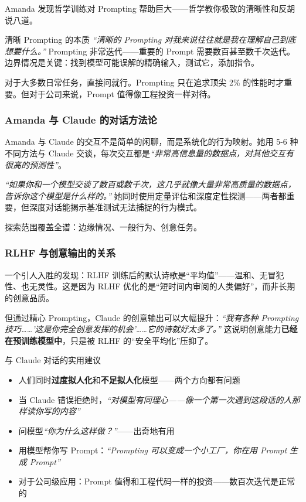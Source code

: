 \documentclass[a4paper]{article}
\begin{document}
Amanda 发现哲学训练对 Prompting 帮助巨大——哲学教你极致的清晰性和反胡说八道。

\begin{importantbox}{清晰 Prompting 的本质}
\textit{``清晰的 Prompting 对我来说往往就是我在理解自己到底想要什么。''} Prompting 非常迭代——重要的 Prompt 需要数百甚至数千次迭代。边界情况是关键：找到模型可能误解的精确输入，测试它，添加指令。

对于大多数日常任务，直接问就行。Prompting 只在追求顶尖 2\% 的性能时才重要。但对于公司来说，Prompt 值得像工程投资一样对待。
\end{importantbox}

\subsubsection{Amanda 与 Claude 的对话方法论}

Amanda 与 Claude 的交互不是简单的闲聊，而是系统化的行为映射。她用 5-6 种不同方法与 Claude 交谈，每次交互都是\textit{``非常高信息量的数据点，对其他交互有很高的预测性''}。

\textit{``如果你和一个模型交谈了数百或数千次，这几乎就像大量非常高质量的数据点，告诉你这个模型是什么样的。''} 她同时使用定量评估和深度定性探测——两者都重要，但深度对话能揭示基准测试无法捕捉的行为模式。

探索范围覆盖全谱：边缘情况、一般行为、创意任务。

\subsubsection{RLHF 与创意输出的关系}

一个引人入胜的发现：RLHF 训练后的默认诗歌是``平均值''——温和、无冒犯性、也无灵性。这是因为 RLHF 优化的是``短时间内审阅的人类偏好''，而非长期的创意品质。

但通过精心 Prompting，Claude 的创意输出可以大幅提升：\textit{``我有各种 Prompting 技巧……'这是你完全创意发挥的机会'……它的诗就好太多了。''} 这说明创意能力\textbf{已经在预训练模型中}，只是被 RLHF 的``安全平均化''压抑了。

\begin{knowledgebox}{与 Claude 对话的实用建议}
\begin{itemize}
    \item 人们同时\textbf{过度拟人化}和\textbf{不足拟人化}模型——两个方向都有问题
    \item 当 Claude 错误拒绝时，\textit{``对模型有同理心——像一个第一次遇到这段话的人那样读你写的内容''}
    \item 问模型\textit{``你为什么这样做？''}——出奇地有用
    \item 用模型帮你写 Prompt：\textit{``Prompting 可以变成一个小工厂，你在用 Prompt 生成 Prompt''}
    \item 对于公司级应用：Prompt 值得和工程代码一样的投资——数百次迭代是正常的
\end{itemize}
\end{knowledgebox}
\end{document}
